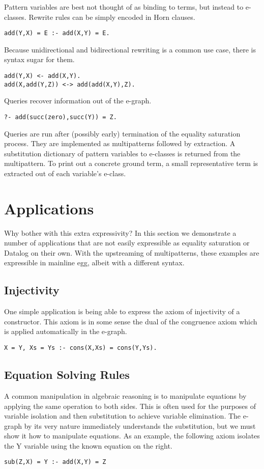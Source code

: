 \documentclass[sigplan,10pt,review]{acmart} %
\begin{document}
Pattern variables are best not thought of as binding to terms, but instead to e-classes. Rewrite rules can be simply encoded in Horn clauses.

\begin{lstlisting}
add(Y,X) = E :- add(X,Y) = E.
\end{lstlisting}

Because unidirectional and bidirectional rewriting is a common use case, there is syntax sugar for them.

\begin{lstlisting}
add(Y,X) <- add(X,Y).
add(X,add(Y,Z)) <-> add(add(X,Y),Z).
\end{lstlisting}

Queries recover information out of the e-graph.

\begin{lstlisting}
?- add(succ(zero),succ(Y)) = Z.
\end{lstlisting}

Queries are run after (possibly early) termination of the equality saturation process. They are implemented as multipatterns followed by extraction. A substitution dictionary of pattern variables to e-classes is returned from the multipattern. To print out a concrete ground term, a small representative term is extracted out of each variable's e-class.

\section{Applications}
Why bother with this extra expressivity? In this section we demonstrate a number of applications that are not easily expressible as equality saturation or Datalog on their own. With the upstreaming of multipatterns, these examples are expressible in mainline egg, albeit with a different syntax.

\subsection{Injectivity}
One simple application is being able to express the axiom of injectivity of a constructor. This axiom is in some sense the dual of the congruence axiom which is applied automatically in the e-graph.

\begin{lstlisting}
X = Y, Xs = Ys :- cons(X,Xs) = cons(Y,Ys).
\end{lstlisting}

\subsection{Equation Solving Rules}
A common manipulation in algebraic reasoning is to manipulate equations by applying the same operation to both sides. This is often used for the purposes of variable isolation and then substitution to achieve variable elimination. The e-graph by its very nature immediately understands the substitution, but we must show it how to manipulate equations. As an example, the following axiom isolates the Y variable using the known equation on the right. 
\begin{lstlisting}
sub(Z,X) = Y :- add(X,Y) = Z
\end{lstlisting}
\end{document}
